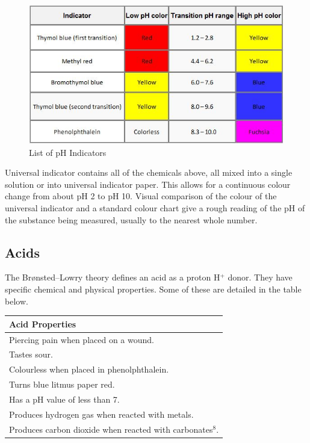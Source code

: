 \begin{figure}[H]
    \includegraphics[width=\textwidth]{./Planning/Images/Indicators.jpg}
    \caption{List of pH Indicators} \label{fig:pH Indicators}
\end{figure}

Universal indicator contains all of the chemicals above, all mixed into a single solution or into universal indicator paper. This allows for a continuous colour change from about pH 2 to pH 10. Visual comparison of the colour of the universal indicator and a standard colour chart give a rough reading of the pH of the substance being measured, usually to the nearest whole number. 


	\subsection{Acids} %

The Brønsted–Lowry theory defines an acid as a proton H$^+$ donor. They have specific chemical and physical properties. Some of these are detailed in the table below.

\begin{center}
\begin{tabular}{|l|}
    \hline
    \textbf{Acid Properties}  \\ \hline
Piercing pain when placed on a wound. \\ \hline
Tastes sour. \\ \hline
Colourless when placed in phenolphthalein. \\ \hline
Turns blue litmus paper red. \\ \hline
Has a pH value of less than 7. \\ \hline
Produces hydrogen gas when reacted with metals. \\ \hline
Produces carbon dioxide when reacted with carbonates$^8$. \\ \hline
\end{tabular}

\label{tab:Acid Properties}
\end{center}


